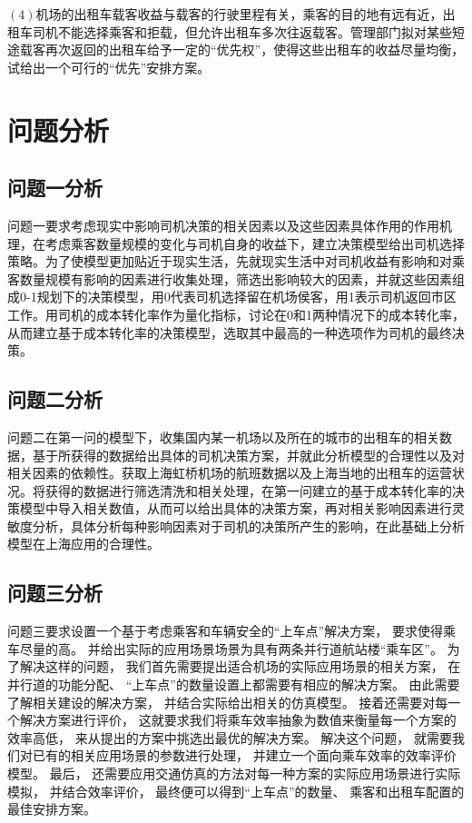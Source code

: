 \documentclass[withoutpreface,bwprint]{cumcmthesis} %
\begin{document}
$(4)$机场的出租车载客收益与载客的行驶里程有关，乘客的目的地有远有近，出租车司机不能选择乘客和拒载，但允许出租车多次往返载客。管理部门拟对某些短途载客再次返回的出租车给予一定的“优先权”，使得这些出租车的收益尽量均衡，试给出一个可行的“优先”安排方案。

\section{问题分析}

\subsection{问题一分析}

问题一要求考虑现实中影响司机决策的相关因素以及这些因素具体作用的作用机理，在考虑乘客数量规模的变化与司机自身的收益下，建立决策模型给出司机选择策略。为了使模型更加贴近于现实生活，先就现实生活中对司机收益有影响和对乘客数量规模有影响的因素进行收集处理，筛选出影响较大的因素，并就这些因素组成0-1规划下的决策模型，用0代表司机选择留在机场侯客，用1表示司机返回市区工作。用司机的成本转化率作为量化指标，讨论在0和1两种情况下的成本转化率，从而建立基于成本转化率的决策模型，选取其中最高的一种选项作为司机的最终决策。

\subsection{问题二分析}

问题二在第一问的模型下，收集国内某一机场以及所在的城市的出租车的相关数据，基于所获得的数据给出具体的司机决策方案，并就此分析模型的合理性以及对相关因素的依赖性。获取上海虹桥机场的航班数据以及上海当地的出租车的运营状况。将获得的数据进行筛选清洗和相关处理，在第一问建立的基于成本转化率的决策模型中导入相关数值，从而可以给出具体的决策方案，再对相关影响因素进行灵敏度分析，具体分析每种影响因素对于司机的决策所产生的影响，在此基础上分析模型在上海应用的合理性。


\subsection{问题三分析}

问题三要求设置一个基于考虑乘客和车辆安全的“上车点”解决方案， 要求使得乘车尽量的高。 并给出实际的应用场景场景为具有两条并行道航站楼“乘车区”。 为了解决这样的问题， 我们首先需要提出适合机场的实际应用场景的相关方案， 在并行道的功能分配、 “上车点”的数量设置上都需要有相应的解决方案。 由此需要了解相关建设的解决方案， 并结合实际给出相关的仿真模型。 接着还需要对每一个解决方案进行评价， 这就要求我们将乘车效率抽象为数值来衡量每一个方案的效率高低， 来从提出的方案中挑选出最优的解决方案。 解决这个问题， 就需要我们对已有的相关应用场景的参数进行处理， 并建立一个面向乘车效率的效率评价模型。 最后， 还需要应用交通仿真的方法对每一种方案的实际应用场景进行实际模拟， 并结合效率评价， 最终便可以得到“上车点”的数量、 乘客和出租车配置的最佳安排方案。
\end{document}
